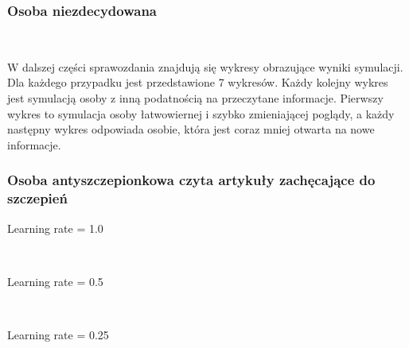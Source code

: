\documentclass[11pt]{article}
\begin{document}
    \subsubsection*{Osoba niezdecydowana}

    \begin{center}
    \end{center}
    { \hspace*{\fill} \\}

W dalszej części sprawozdania znajdują się wykresy obrazujące wyniki symulacji.
Dla każdego przypadku jest przedstawione 7 wykresów. Każdy kolejny wykres jest symulacją osoby
z inną podatnością na przeczytane informacje. Pierwszy wykres to symulacja osoby łatwowiernej
i szybko zmieniającej poglądy, a każdy następny wykres odpowiada osobie, która jest coraz mniej 
otwarta na nowe informacje. 

\newpage
\subsubsection*{Osoba antyszczepionkowa czyta artykuły zachęcające do szczepień}

    Learning rate = 1.0

    \begin{center}
    \end{center}
    { \hspace*{\fill} \\}

    \newpage
    Learning rate = 0.5

    \begin{center}
    \end{center}
    { \hspace*{\fill} \\}

    \newpage
    Learning rate = 0.25

    \begin{center}
    \end{center}
    { \hspace*{\fill} \\}
\end{document}
